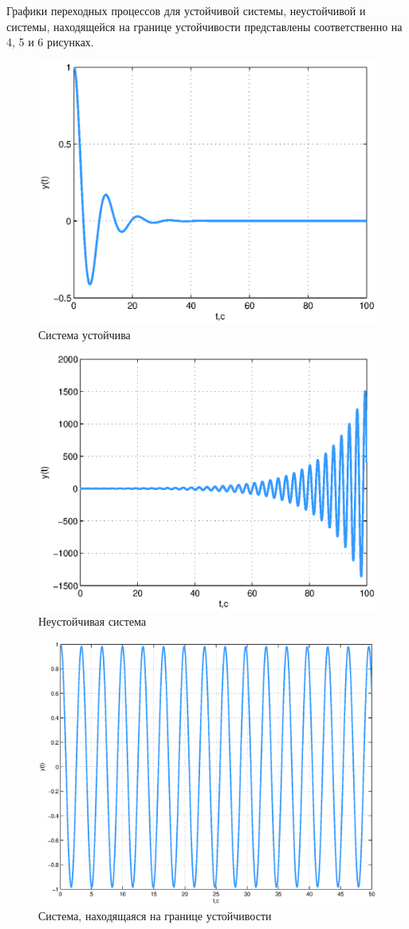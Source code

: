 \documentclass[12pt,a4paper]{article}
\begin{document}
Графики переходных процессов для устойчивой системы, неустойчивой и системы, находящейся на границе устойчивости представлены соответственно на 4, 5 и 6 рисунках.
\begin{figure}[H]
	\centering
	\includegraphics[width=0.8\linewidth]{scheme8lab/plot1.eps}
	\caption{Система устойчива}
\end{figure}
\begin{figure}[H]
	\centering
	\includegraphics[width=0.8\linewidth]{scheme8lab/plot2.eps}
	\caption{Неустойчивая система}
\end{figure}
\begin{figure}[H]
	\centering
	\includegraphics[width=0.8\linewidth]{scheme8lab/plot3.eps}
	\caption{Система, находящаяся на границе устойчивости}
\end{figure}
\end{document}
